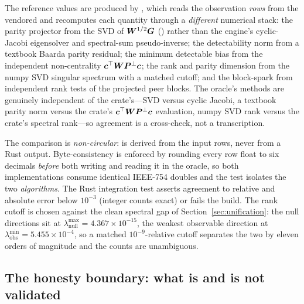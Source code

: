 The reference values are produced by , which reads the
observation \emph{rows} from the vendored  and recomputes each quantity
through a \emph{different} numerical stack: the parity projector from the SVD of
$\bm{W}^{1/2}\bm{G}$ () rather than the engine's cyclic-Jacobi
eigensolver and spectral-sum pseudo-inverse; the detectability norm from a textbook Baarda
parity residual; the minimum detectable bias from the independent non-centrality
$\bm c^\top\bm{W}\bm{P}^{\perp}\bm c$; the rank and parity dimension from the numpy SVD singular
spectrum with a matched cutoff; and the block-spark from independent rank tests of the
projected peer blocks. The oracle's methods are genuinely independent of the crate's---SVD
versus cyclic Jacobi, a textbook parity norm versus the crate's $\bm c^\top\bm{W}\bm{P}^{\perp}\bm c$
evaluation, numpy SVD rank versus the crate's spectral rank---so agreement is a cross-check,
not a transcription.

The comparison is \emph{non-circular}:  is derived from the input rows,
never from a Rust output. Byte-consistency is enforced by rounding every row float to six
decimals \emph{before} both writing  and reading it in the oracle, so both
implementations consume identical IEEE-754 doubles and the test isolates the two
\emph{algorithms}. The Rust integration test 
asserts agreement to relative and absolute error below $10^{-3}$ (integer counts exact) or
fails the build. The rank cutoff is chosen against the clean spectral gap of
Section~\ref{sec:unification}: the null directions sit at
$\lambda_{\text{null}}^{\max}=4.367\times10^{-15}$, the weakest observable direction at
$\lambda_{\text{obs}}^{\min}=5.455\times10^{-4}$, so a matched $10^{-9}$-relative cutoff
separates the two by eleven orders of magnitude and the counts are unambiguous.

\subsection{The honesty boundary: what is and is not validated}
\label{sec:boundary}

